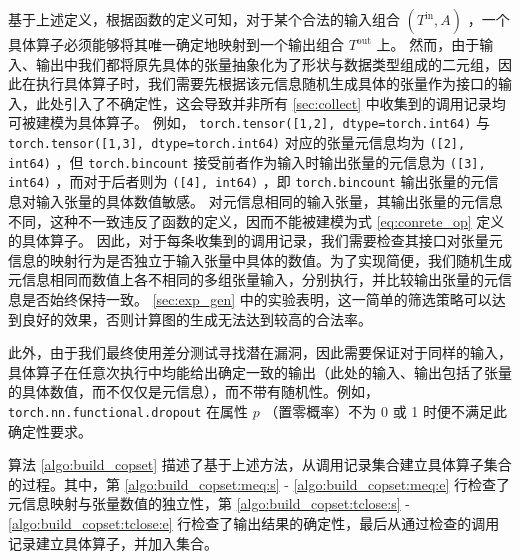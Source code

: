 基于上述定义，根据函数的定义可知，对于某个合法的输入组合 $(T^\text{in}, A)$ ，一个具体算子必须能够将其唯一确定地映射到一个输出组合 $T^\text{out}$ 上。
然而，由于输入、输出中我们都将原先具体的张量抽象化为了形状与数据类型组成的二元组，因此在执行具体算子时，我们需要先根据该元信息随机生成具体的张量作为接口的输入，此处引入了不确定性，这会导致并非所有 \ref{sec:collect} 中收集到的调用记录均可被建模为具体算子。
例如， \texttt{torch.tensor([1,2], dtype=torch.int64)} 与 \texttt{torch.tensor([1,3], dtype=torch.int64)} 对应的张量元信息均为 \texttt{([2], int64)} ，但 \texttt{torch.bincount} 接受前者作为输入时输出张量的元信息为 \texttt{([3], int64)} ，而对于后者则为 \texttt{([4], int64)} ，即 \texttt{torch.bincount} 输出张量的元信息对输入张量的具体数值敏感。
对元信息相同的输入张量，其输出张量的元信息不同，这种不一致违反了函数的定义，因而不能被建模为式 \eqref{eq:conrete_op} 定义的具体算子。
因此，对于每条收集到的调用记录，我们需要检查其接口对张量元信息的映射行为是否独立于输入张量中具体的数值。为了实现简便，我们随机生成元信息相同而数值上各不相同的多组张量输入，分别执行，并比较输出张量的元信息是否始终保持一致。 \ref{sec:exp_gen} 中的实验表明，这一简单的筛选策略可以达到良好的效果，否则计算图的生成无法达到较高的合法率。

此外，由于我们最终使用差分测试寻找潜在漏洞，因此需要保证对于同样的输入，具体算子在任意次执行中均能给出确定一致的输出（此处的输入、输出包括了张量的具体数值，而不仅仅是元信息），而不带有随机性。例如， \texttt{torch.nn.functional.dropout} 在属性 $p$ （置零概率）不为 0 或 1 时便不满足此确定性要求。

算法 \ref{algo:build_copset} 描述了基于上述方法，从调用记录集合建立具体算子集合的过程。其中，第 \ref{algo:build_copset:meq:s} - \ref{algo:build_copset:meq:e} 行检查了元信息映射与张量数值的独立性，第 \ref{algo:build_copset:tclose:s} - \ref{algo:build_copset:tclose:e} 行检查了输出结果的确定性，最后从通过检查的调用记录建立具体算子，并加入集合。

